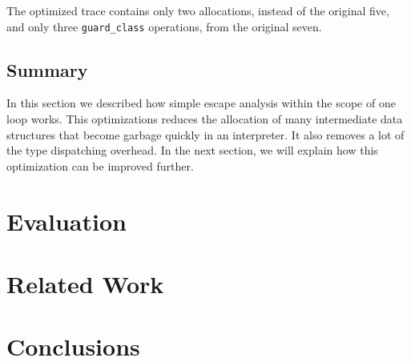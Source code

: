\documentclass{sigplanconf}
\begin{document}
The optimized trace contains only two allocations, instead of the original five,
and only three \texttt{guard\_class} operations, from the original seven.



\subsection{Summary}

In this section we described how simple escape analysis within the scope of one
loop works. This optimizations reduces the allocation of many intermediate data
structures that become garbage quickly in an interpreter. It also removes a lot
of the type dispatching overhead. In the next section, we will explain how this
optimization can be improved further.



\section{Evaluation}
\label{sec:Evaluation}


\section{Related Work}
\label{sec:related}

\section{Conclusions}
\label{sec:conclusions}



\end{document}
